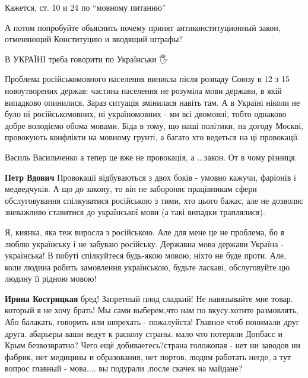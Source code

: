 \begin{itemize}
\begin{itemize}
Кажется, ст. 10 и 24 по \enquote{мовному питанню}

А потом попробуйте обьяснить почему принят антиконституционный закон,
отменяющий Конституцию и вводящий штрафы?

\end{itemize}


В УКРАЇНІ треба говорити по Українськи 🖐️


Проблема російськомовного населення виникла після розпаду Союзу в 12 з 15
новоутворених держав: частина населення не розуміла мови держави, в якій
випадково опинилися. Зараз ситуація змінилася навіть там. А в Україні ніколи не
було ні російськомовних, ні україномовних - ми всі двомовні, тобто однаково
добре володіємо обома мовами. Біда в тому, що наші політики, на догоду Москві,
провокують конфлікти на мовному грунті, а багато хто ведеться на ці провокації.

\begin{itemize}
Василь Васильченко а тепер це вже не провокація, а ...закон.
От в чому різниця.


\textbf{Петр Вдович} Провокації відбуваються з двох боків - умовно кажучи,
фаріонів і медведчуків. А що до закону, то він не забороняє працівникам сфери
обслуговування спілкуватися російською з тими, хто цього бажає, але не дозволяє
зневажливо ставитися до української мови (а такі випадки траплялися).
\end{itemize}


Я, киянка, яка теж виросла з російською. Але для мене це не проблема, бо я
люблю українську і не забуваю російську. Державна мова держави Україна -
українська! В побуті спілкуйтеся будь-якою мовою, ніхто не буде проти. Але,
коли людина робить замовлення українською, будьте ласкаві, обслуговуйте цю
людину її рідною мовою!

\begin{itemize}
\textbf{Ирина Кострицкая} бред! Запретный плод сладкий! Не навязывайте мне
товар. который я не хочу брать! Мы сами выберем,что нам по вкусу.хотите
размовлять, Або балакать, говорить или шпрехать - пожалуйста! Главное чтоб
понимали друг друга. абарьеры ваши ведут к расколу страны. мало что потеряли
Донбасс и Крым безвозвратно? Чего ещё добиваетесь?страна голожопая - нет ни
заводов ни фабрик, нет медицины и образования, нет портов, людям работать негде, а
тут вопрос главный - мова.... вы подурали ,после скачек на майдане?


\end{itemize}
\end{itemize}
